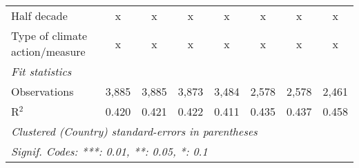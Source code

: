 \begin{tabular}{lccccccc}
   Half decade                                                                   & x              & x              & x             & x              & x             & x              & x\\  
   Type of climate action/measure                                                & x              & x              & x             & x              & x             & x              & x\\  
   \midrule \emph{Fit statistics}\\
   Observations                                                                  & 3,885          & 3,885          & 3,873         & 3,484          & 2,578         & 2,578          & 2,461\\  
   R$^2$                                                                         & 0.420          & 0.421          & 0.422         & 0.411          & 0.435         & 0.437          & 0.458\\  
   \midrule
   \multicolumn{8}{l}{\emph{Clustered (Country) standard-errors in parentheses}}\\
   \multicolumn{8}{l}{\emph{Signif. Codes: ***: 0.01, **: 0.05, *: 0.1}}\\
\end{tabular}
\par\endgroup


